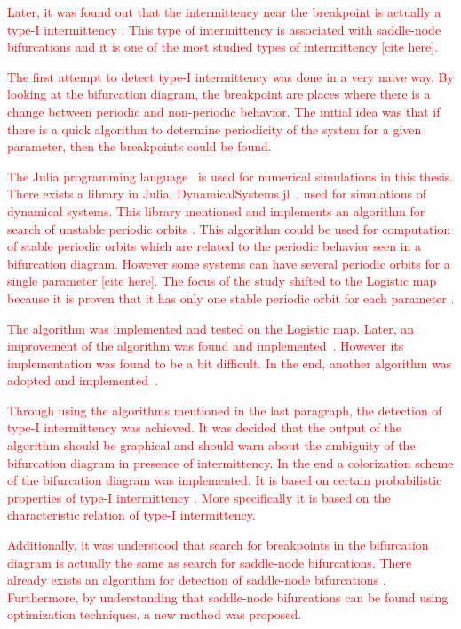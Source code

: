 \par
\textcolor{red}{
Later, it was found out that the intermittency near the breakpoint is actually a type-I intermittency \cite{Elaskar2022}.
This type of intermittency is associated with saddle-node bifurcations and it is one of the most studied types of intermittency [cite here].
}
\par
\textcolor{red}{
The first attempt to detect type-I intermittency was done in a very naive way.
By looking at the bifurcation diagram, the breakpoint are places where there is a change between periodic and non-periodic behavior.
The initial idea was that if there is a quick algorithm to determine periodicity of the system for a given parameter, then the breakpoints could be found.

The Julia programming language~\cite{Bezanson2017,Bezanson20181024} is used for numerical simulations in this thesis.
There exists a library in Julia, DynamicalSystems.jl~\cite{Datseris2018}, used for simulations of dynamical systems.
This library mentioned and implements an algorithm for search of unstable periodic orbits \cite{Schmelcher1997}.
This algorithm could be used for computation of stable periodic orbits which are related to the periodic behavior seen in a bifurcation diagram.
However some systems can have several periodic orbits for a single parameter [cite here].
The focus of the study shifted to the Logistic map because it is proven that it has only one stable periodic orbit for each parameter \cite{Devaney20211026}.
}
\par
\textcolor{red}{
The algorithm was implemented and tested on the Logistic map.
Later, an improvement of the algorithm was found and implemented~\cite{Davidchack1999, Davidchack2001, Klebanoff2001, Crofts2007}.
However its implementation was found to be a bit difficult.
In the end, another algorithm was adopted and implemented~\cite{Bu2004}.
}
\par
\textcolor{red}{
Through using the algorithms mentioned in the last paragraph, the detection of type-I intermittency was achieved.
It was decided that the output of the algorithm should be graphical and should warn about the ambiguity of the bifurcation diagram in presence of intermittency.
In the end a colorization scheme of the bifurcation diagram was implemented.
It is based on certain probabilistic properties of type-I intermittency \cite{DelRio2014}.
More specifically it is based on the characteristic relation of type-I intermittency.
}
\par
\textcolor{red}{
Additionally, it was understood that search for breakpoints in the bifurcation diagram is actually the same as search for saddle-node bifurcations.
There already exists an algorithm for detection of saddle-node bifurcations \cite{Matsushita20170721}.
Furthermore, by understanding that saddle-node bifurcations can be found using optimization techniques, a new method was proposed.
}
